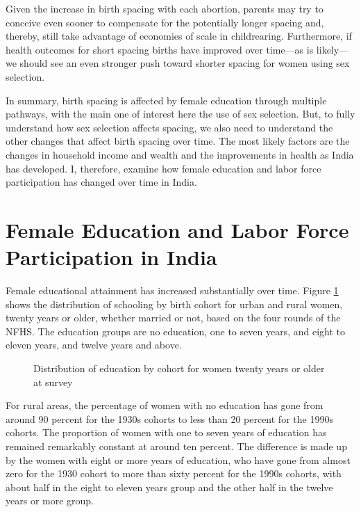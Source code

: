 \documentclass[12pt,letterpaper]{article}
\begin{document}
Given the increase in birth spacing with each abortion, parents may try to 
conceive even sooner to compensate for the potentially longer spacing and, 
thereby, still take advantage of economies of scale in childrearing.
Furthermore, if health outcomes for short spacing births have improved over 
time---as is likely---we should see an even stronger push toward shorter 
spacing for women using sex selection.

In summary, birth spacing is affected by female education through 
multiple pathways, with the main one of interest here the use of 
sex selection. 
But, to fully understand how sex selection affects spacing, we also 
need to understand the other changes that affect birth spacing over time.
The most likely factors are the changes in household income and 
wealth and the improvements in health as India has developed.
I, therefore, examine how female education and labor force 
participation has changed over time in India.


\section{Female Education and Labor Force Participation in India}

Female educational attainment has increased substantially over time.
Figure \ref{fig:education_over_time} shows the distribution of schooling by birth 
cohort for urban and rural women, 
twenty years or older, whether married or not, based on the four rounds of the NFHS.
The education groups are no education, one to seven years, and eight to eleven years,
and twelve years and above.

\begin{figure}[htpb]
\centering
{} 
\caption{Distribution of education by cohort for women twenty years or older at survey}
\label{fig:education_over_time}
\end{figure}


For rural areas, the percentage of women with no education has gone from around 90 percent
for the 1930s cohorts to less than 20 percent for the 1990s cohorts. 
The proportion of women with one to seven years of education has remained remarkably
constant at around ten percent.
The difference is made up by the women with eight or more years of education, who have
gone from almost zero for the 1930 cohort to more than sixty percent for the 1990s cohorts,
with about half in the eight to eleven years group and 
the other half in the twelve years or more group.
\end{document}
